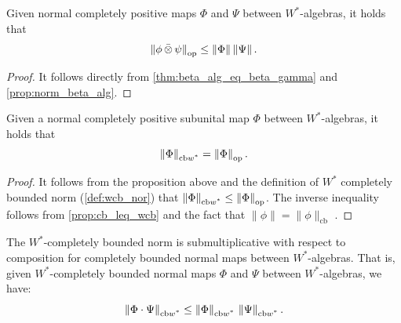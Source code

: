 \begin{proposition} \label{prop:cb_tensor_mult}
  Given normal completely positive maps  $\Phi$ and $\Psi$ between $W^*$-algebras, it holds that
  \[
  \left\lVert \phi \,\bar{\otimes} \, \psi \right\rVert_{\text{op}} \leq \left\lVert \Phi \right\rVert \left\lVert \Psi \right\rVert.
\]
\end{proposition}

\begin{proof}
It follows directly from \autoref{thm:beta_alg_eq_beta_gamma} and 
\autoref{prop:norm_beta_alg}.
\end{proof}

\begin{corollary} \label{cor:cbnorm_tensor_leq_norm}
   Given a normal completely positive subunital map  $\Phi$ between $W^*$-algebras, it holds that
   \[
  \left\lVert \Phi \right\rVert_{\text{cb$w^*$}} =\left\lVert \Phi \right\rVert_{\text{op}}.
\]
\end{corollary}

\begin{proof}
  It follows from the proposition above and the definition of $W^*$ completely bounded norm (\autoref{def:wcb_nor}) that $\left\lVert \Phi \right\rVert_{\text{cb$w^*$}} \leq \left\lVert \Phi \right\rVert_{\text{op}}$. The inverse inequality follows from \autoref{prop:cb_leq_wcb} and the fact that $\|\phi\| = \|\phi\|_{\text{cb}}$ \cite[Exercise 11.5 (iii)]{pisierIntroductionOperatorSpace2003}.
\end{proof}

\begin{proposition} \label{prop:w*cb_submult}
  The $W^*$-completely bounded norm is submultiplicative with respect to composition for completely bounded normal maps between $W^*$-algebras. That is, given $W^*$-completely bounded normal maps $\Phi$ and $\Psi$ between $W^*$-algebras, we have:
  \[
    \left\lVert \Phi \cdot \Psi \right\rVert_{\text{cb$w^*$}} \leq \left\lVert \Phi \right\rVert_{\text{cb$w^*$}} \, \left\lVert \Psi \right\rVert_{\text{cb$w^*$}}.
  \]
\end{proposition}

